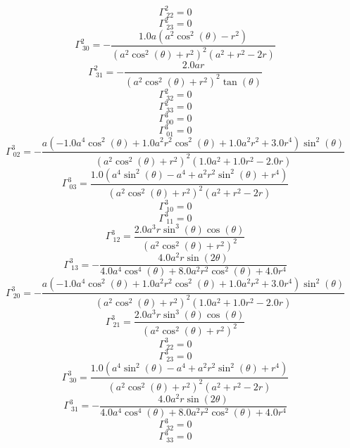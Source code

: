 \documentclass[a4paper, 12pt]{article}
\begin{document}
\[\Gamma^{2}_{\ 22}=0\]
\[\Gamma^{2}_{\ 23}=0\]
\[\Gamma^{2}_{\ 30}=- \frac{1.0 a \left(a^{2} \cos^{2}{\left(\theta \right)} - r^{2}\right)}{\left(a^{2} \cos^{2}{\left(\theta \right)} + r^{2}\right)^{2} \left(a^{2} + r^{2} - 2 r\right)}\]
\[\Gamma^{2}_{\ 31}=- \frac{2.0 a r}{\left(a^{2} \cos^{2}{\left(\theta \right)} + r^{2}\right)^{2} \tan{\left(\theta \right)}}\]
\[\Gamma^{2}_{\ 32}=0\]
\[\Gamma^{2}_{\ 33}=0\]
\[\Gamma^{3}_{\ 00}=0\]
\[\Gamma^{3}_{\ 01}=0\]
\[\Gamma^{3}_{\ 02}=- \frac{a \left(- 1.0 a^{4} \cos^{2}{\left(\theta \right)} + 1.0 a^{2} r^{2} \cos^{2}{\left(\theta \right)} + 1.0 a^{2} r^{2} + 3.0 r^{4}\right) \sin^{2}{\left(\theta \right)}}{\left(a^{2} \cos^{2}{\left(\theta \right)} + r^{2}\right)^{2} \left(1.0 a^{2} + 1.0 r^{2} - 2.0 r\right)}\]
\[\Gamma^{3}_{\ 03}=\frac{1.0 \left(a^{4} \sin^{2}{\left(\theta \right)} - a^{4} + a^{2} r^{2} \sin^{2}{\left(\theta \right)} + r^{4}\right)}{\left(a^{2} \cos^{2}{\left(\theta \right)} + r^{2}\right)^{2} \left(a^{2} + r^{2} - 2 r\right)}\]
\[\Gamma^{3}_{\ 10}=0\]
\[\Gamma^{3}_{\ 11}=0\]
\[\Gamma^{3}_{\ 12}=\frac{2.0 a^{3} r \sin^{3}{\left(\theta \right)} \cos{\left(\theta \right)}}{\left(a^{2} \cos^{2}{\left(\theta \right)} + r^{2}\right)^{2}}\]
\[\Gamma^{3}_{\ 13}=- \frac{4.0 a^{2} r \sin{\left(2 \theta \right)}}{4.0 a^{4} \cos^{4}{\left(\theta \right)} + 8.0 a^{2} r^{2} \cos^{2}{\left(\theta \right)} + 4.0 r^{4}}\]
\[\Gamma^{3}_{\ 20}=- \frac{a \left(- 1.0 a^{4} \cos^{2}{\left(\theta \right)} + 1.0 a^{2} r^{2} \cos^{2}{\left(\theta \right)} + 1.0 a^{2} r^{2} + 3.0 r^{4}\right) \sin^{2}{\left(\theta \right)}}{\left(a^{2} \cos^{2}{\left(\theta \right)} + r^{2}\right)^{2} \left(1.0 a^{2} + 1.0 r^{2} - 2.0 r\right)}\]
\[\Gamma^{3}_{\ 21}=\frac{2.0 a^{3} r \sin^{3}{\left(\theta \right)} \cos{\left(\theta \right)}}{\left(a^{2} \cos^{2}{\left(\theta \right)} + r^{2}\right)^{2}}\]
\[\Gamma^{3}_{\ 22}=0\]
\[\Gamma^{3}_{\ 23}=0\]
\[\Gamma^{3}_{\ 30}=\frac{1.0 \left(a^{4} \sin^{2}{\left(\theta \right)} - a^{4} + a^{2} r^{2} \sin^{2}{\left(\theta \right)} + r^{4}\right)}{\left(a^{2} \cos^{2}{\left(\theta \right)} + r^{2}\right)^{2} \left(a^{2} + r^{2} - 2 r\right)}\]
\[\Gamma^{3}_{\ 31}=- \frac{4.0 a^{2} r \sin{\left(2 \theta \right)}}{4.0 a^{4} \cos^{4}{\left(\theta \right)} + 8.0 a^{2} r^{2} \cos^{2}{\left(\theta \right)} + 4.0 r^{4}}\]
\[\Gamma^{3}_{\ 32}=0\]
\[\Gamma^{3}_{\ 33}=0\]
\end{document}
